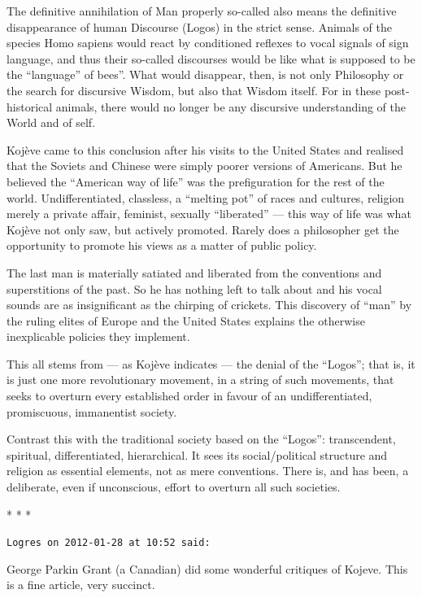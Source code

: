 \begin{quotex}
The definitive annihilation of Man properly so-called also means the definitive disappearance of human Discourse (Logos) in the strict sense. Animals of the species Homo sapiens would react by conditioned reflexes to vocal signals of sign language, and thus their so-called discourses would be like what is supposed to be the ``language'' of bees''. What would disappear, then, is not only Philosophy or the search for discursive Wisdom, but also that Wisdom itself. For in these post-historical animals, there would no longer be any discursive understanding of the World and of self.
\end{quotex}


Kojève came to this conclusion after his visits to the United States and realised that the Soviets and Chinese were simply poorer versions of Americans. But he believed the ``American way of life'' was the prefiguration for the rest of the world. Undifferentiated, classless, a ``melting pot'' of races and cultures, religion merely a private affair, feminist, sexually ``liberated'' --- this way of life was what Kojève not only saw, but actively promoted. Rarely does a philosopher get the opportunity to promote his views as a matter of public policy.

The last man is materially satiated and liberated from the conventions and superstitions of the past. So he has nothing left to talk about and his vocal sounds are as insignificant as the chirping of crickets. This discovery of ``man'' by the ruling elites of Europe and the United States explains the otherwise inexplicable policies they implement.

This all stems from --- as Kojève indicates --- the denial of the ``Logos''; that is, it is just one more revolutionary movement, in a string of such movements, that seeks to overturn every established order in favour of an undifferentiated, promiscuous, immanentist society.

Contrast this with the traditional society based on the ``Logos'': transcendent, spiritual, differentiated, hierarchical. It sees its social/political structure and religion as essential elements, not as mere conventions. There is, and has been, a deliberate, even if unconscious, effort to overturn all such societies.



\begin{center}* * *\end{center}

\begin{footnotesize}
\begin{sffamily}
\texttt{Logres on 2012-01-28 at 10:52 said:}

George Parkin Grant (a Canadian) did some wonderful critiques of Kojeve. This is a fine article, very succinct.


\hfill

\end{sffamily}
\end{footnotesize}

